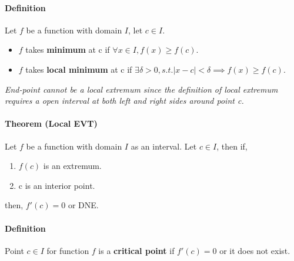 \documentclass{article}
\begin{document}
	\paragraph{Definition} Let $f$ be a function with domain $I$, let $c \in I$.
	\begin{itemize}
		\item $f$ takes \textbf{minimum} at c if $\forall x \in I, f(x) \geq f(c)$.
		\item $f$ takes \textbf{local minimum} at c if $\exists \delta > 0, s.t. \lvert x - c \rvert < \delta \implies f(x) \geq f(c)$.
	\end{itemize}

	\emph{End-point cannot be a local extremum since the definition of local extremum requires a open interval at both left and right sides around point c.}

	\paragraph{Theorem (Local EVT)} Let $f$ be a function with domain $I$ as an interval. Let $c \in I$, then if,
	\begin{enumerate}
		\item $f(c)$ is an extremum.
		\item c is an interior point.
	\end{enumerate}
	then, $f'(c) = 0$ or DNE.

	\paragraph{Definition} Point $c \in I$ for function $f$ is a \textbf{critical point} if $f'(c) = 0$ or it does not exist.
\end{document}
